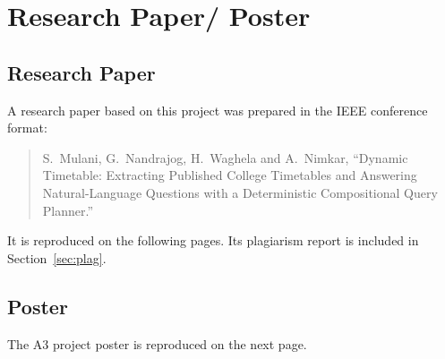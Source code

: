 \section{Research Paper/ Poster}

\subsection{Research Paper}
A research paper based on this project was prepared in the IEEE conference format:
\begin{quote}
S.~Mulani, G.~Nandrajog, H.~Waghela and A.~Nimkar, ``Dynamic Timetable: Extracting Published College
Timetables and Answering Natural-Language Questions with a Deterministic Compositional Query
Planner.''
\end{quote}
It is reproduced on the following pages. Its plagiarism report is included in
Section~\ref{sec:plag}.



\subsection{Poster}
The A3 project poster is reproduced on the next page.


